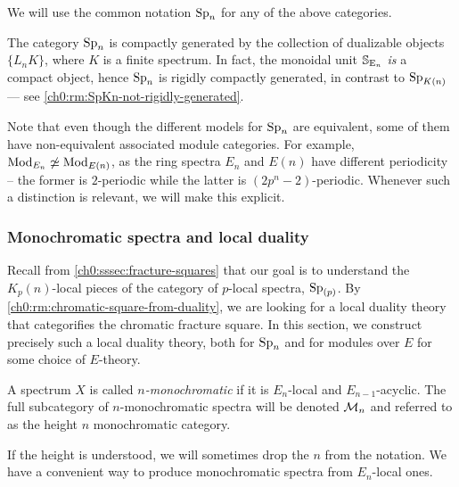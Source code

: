 \begin{notation}
    We will use the common notation $\sp\np$ for any of the above categories. 
\end{notation}

\begin{remark}
    The category $\Sp\np$ is compactly generated by the collection of dualizable objects $\{L_n K\}$, where $K$ is a finite spectrum. In fact, the monoidal unit $\S_{\En}$ \emph{is} a compact object, hence $\Sp\np$ is rigidly compactly generated, in contrast to $\SpK$ --- see \cref{ch0:rm:SpKn-not-rigidly-generated}.
\end{remark}

\begin{remark}
    Note that even though the different models for $\sp\np$ are equivalent, some of them have non-equivalent associated module categories. For example, $\Mod_{E_n}\not \simeq \Mod_{E(n)}$, as the ring spectra $E_n$ and $E(n)$ have different periodicity -- the former is $2$-periodic while the latter is $(2p^n-2)$-periodic. Whenever such a distinction is relevant, we will make this explicit. 
\end{remark}





\subsubsection{Monochromatic spectra and local duality}
\label{ch0:sssec:monochromatic-duality}

Recall from \cref{ch0:sssec:fracture-squares} that our goal is to understand the $K_p(n)$-local pieces of the category of $p$-local spectra, $\sp_{(p)}$. By \cref{ch0:rm:chromatic-square-from-duality}, we are looking for a local duality theory that categorifies the chromatic fracture square. In this section, we construct precisely such a local duality theory, both for $\sp\np$ and for modules over $E$ for some choice of $E$-theory. 



\begin{definition}
    \label{ch0:def:monochromatic-spectrum}
    A spectrum $X$ is called \emph{$n$-monochromatic} if it is $E_n$-local and $E_{n-1}$-acyclic. The full subcategory of $n$-monochromatic spectra will be denoted $\M\np$ and referred to as the height $n$ monochromatic category.
\end{definition}

If the height is understood, we will sometimes drop the $n$ from the notation. We have a convenient way to produce monochromatic spectra from $E_n$-local ones. 


